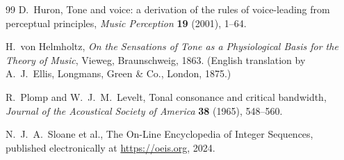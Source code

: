 \documentclass[11pt,a4paper]{article}
\begin{document}
\begin{thebibliography}{99}
D.~Huron,
Tone and voice: a derivation of the rules of voice-leading from perceptual
principles,
\emph{Music Perception} \textbf{19} (2001), 1--64.

H.~von Helmholtz,
\emph{On the Sensations of Tone as a Physiological Basis for the Theory of Music},
Vieweg, Braunschweig, 1863.
(English translation by A.~J.~Ellis, Longmans, Green \& Co., London, 1875.)

R.~Plomp and W.~J.~M.~Levelt,
Tonal consonance and critical bandwidth,
\emph{Journal of the Acoustical Society of America} \textbf{38} (1965), 548--560.

N.~J.~A.~Sloane et al.,
The On-Line Encyclopedia of Integer Sequences,
published electronically at \url{https://oeis.org}, 2024.

\end{thebibliography}
\end{document}
